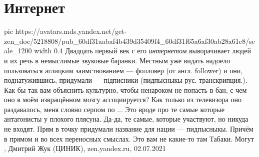  
 
 
 
 
\chapter{Интернет}
\label{sec:slova.internet}

\ifcmt
  pic https://avatars.mds.yandex.net/get-zen_doc/5218808/pub_60df31aabaf4b439d35409f4_60df31f65a6af30ab28a61c8/scale_1200
	width 0.4
\fi
Двадцать первый век с его \emph{интернетом} выворачивает людей и их речь в немыслимые
звуковые баранки. Местным уже видать надоело пользоваться аглицким
заимствованием — фолловер (от англ. follower) и они, поднатужившись, придумали
— підписники (пидпысныкы рус. транскрипция.). Как бы так вам объяснить
культурно, чтобы ненароком не попасть в бан, с чем оно в моём извращённом мозгу
ассоциируется? Как только из телевизора оно раздавалось, меня словно серпом по
... Это вроде про те самые которые антагонисты у плохого плясуна. Да-да, те
самые, которые участвуют, но никуда не входят. Прям в точку придумали название
для нации — пидпысныкы. Причём в прямом и во всех переносных смыслах. Это вам
не какие-то там Табаки. Могут
, Дмитрий Жук (ЦИНИК), zen.yandex.ru, 02.07.2021

